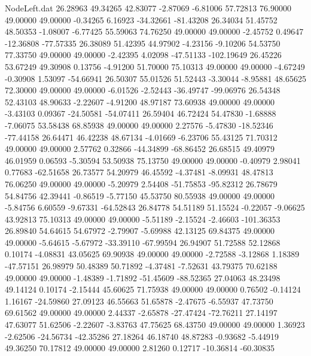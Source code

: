 \begin{filecontents}{NodeLeft.dat}
  26.28963   49.34265   42.83077    -2.87069   -6.81006   57.72813   76.90000   49.00000   49.00000   -0.34265    6.16923  -34.32661  -81.43208
  26.34034   51.45752   48.50353    -1.08007   -6.77425   55.59063   74.76250   49.00000   49.00000   -2.45752    0.49647  -12.36808  -77.57335
  26.38089   51.42395   44.97902    -4.23156   -9.10206   54.53750   77.33750   49.00000   49.00000   -2.42395    4.02098  -47.51133 -102.19649
  26.45226   53.67249   49.30908     0.13756   -4.91200   51.70000   75.10313   49.00000   49.00000   -4.67249   -0.30908    1.53097  -54.66941
  26.50307   55.01526   51.52443    -3.30044   -8.95881   48.65625   72.30000   49.00000   49.00000   -6.01526   -2.52443  -36.49747  -99.06976
  26.54348   52.43103   48.90633    -2.22607   -4.91200   48.97187   73.60938   49.00000   49.00000   -3.43103    0.09367  -24.50581  -54.07411
  26.59404   46.72424   54.47830    -1.68888   -7.06075   53.58438   68.85938   49.00000   49.00000    2.27576   -5.47830  -18.52346  -77.44158
  26.64471   46.42238   48.67134    -4.01669   -6.23706   55.43125   71.70312   49.00000   49.00000    2.57762    0.32866  -44.34899  -68.86452
  26.68515   49.40979   46.01959     0.06593   -5.30594   53.50938   75.13750   49.00000   49.00000   -0.40979    2.98041    0.77683  -62.51658
  26.73577   54.20979   46.45592    -4.37481   -8.09931   48.47813   76.06250   49.00000   49.00000   -5.20979    2.54408  -51.75853  -95.82312
  26.78679   54.84756   42.39441    -0.86519   -5.77150   45.53750   80.55938   49.00000   49.00000   -5.84756    6.60559   -9.67331  -64.52843
  26.84778   54.51189   51.15524    -0.22057   -9.06625   43.92813   75.10313   49.00000   49.00000   -5.51189   -2.15524   -2.46603 -101.36353
  26.89840   54.64615   54.67972    -2.79907   -5.69988   42.13125   69.84375   49.00000   49.00000   -5.64615   -5.67972  -33.39110  -67.99594
  26.94907   51.72588   52.12868     0.10174   -4.08831   43.05625   69.90938   49.00000   49.00000   -2.72588   -3.12868    1.18389  -47.57151
  26.98979   50.48389   50.71892    -4.37481   -7.52631   43.79375   70.62188   49.00000   49.00000   -1.48389   -1.71892  -51.45609  -88.52365
  27.04063   48.23498   49.14124     0.10174   -2.15444   45.60625   71.75938   49.00000   49.00000    0.76502   -0.14124    1.16167  -24.59860
  27.09123   46.55663   51.65878    -2.47675   -6.55937   47.73750   69.61562   49.00000   49.00000    2.44337   -2.65878  -27.47424  -72.76211
  27.14197   47.63077   51.62506    -2.22607   -3.83763   47.75625   68.43750   49.00000   49.00000    1.36923   -2.62506  -24.56734  -42.35286
  27.18264   46.18740   48.87283    -0.93682   -5.44919   49.36250   70.17812   49.00000   49.00000    2.81260    0.12717  -10.36814  -60.30835

\end{filecontents}
